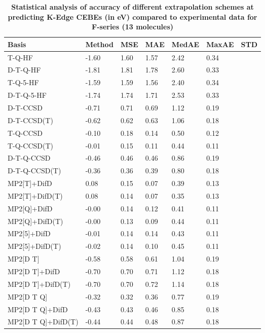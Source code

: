 \begin{table}
  \caption{\textbf{Statistical analysis of accuracy of different extrapolation schemes at predicting K-Edge CEBEs (in eV) compared to experimental data for F-series (13 molecules)}}
  \label{tbl:extrap-scheme-summary-f}
  \begin{tabular}{l l l l l l l }
    \toprule
    \textbf{Basis} & \textbf{Method} & \textbf{MSE} & \textbf{MAE} & \textbf{MedAE} & \textbf{MaxAE} & \textbf{STD} \\ 
    \midrule
    T-Q-HF & -1.60 & 1.60 & 1.57 & 2.42 & 0.34 \\ 
    D-T-Q-HF & -1.81 & 1.81 & 1.78 & 2.60 & 0.33 \\ 
    T-Q-5-HF & -1.59 & 1.59 & 1.56 & 2.40 & 0.34 \\ 
    D-T-Q-5-HF & -1.74 & 1.74 & 1.71 & 2.53 & 0.33 \\ 
    D-T-CCSD & -0.71 & 0.71 & 0.69 & 1.12 & 0.19 \\ 
    D-T-CCSD(T) & -0.62 & 0.62 & 0.63 & 1.06 & 0.18 \\ 
    T-Q-CCSD & -0.10 & 0.18 & 0.14 & 0.50 & 0.12 \\ 
    T-Q-CCSD(T) & -0.01 & 0.15 & 0.11 & 0.44 & 0.11 \\ 
    D-T-Q-CCSD & -0.46 & 0.46 & 0.46 & 0.86 & 0.19 \\ 
    D-T-Q-CCSD(T) & -0.36 & 0.36 & 0.39 & 0.80 & 0.18 \\ 
    MP2[T]+DifD & 0.08 & 0.15 & 0.07 & 0.39 & 0.13 \\ 
    MP2[T]+DifD(T) & 0.08 & 0.14 & 0.07 & 0.35 & 0.13 \\ 
    MP2[Q]+DifD & -0.00 & 0.14 & 0.12 & 0.41 & 0.11 \\ 
    MP2[Q]+DifD(T) & -0.00 & 0.13 & 0.09 & 0.44 & 0.11 \\ 
    MP2[5]+DifD & -0.01 & 0.14 & 0.14 & 0.43 & 0.11 \\ 
    MP2[5]+DifD(T) & -0.02 & 0.14 & 0.10 & 0.45 & 0.11 \\ 
    MP2[D T] & -0.58 & 0.58 & 0.61 & 1.04 & 0.19 \\ 
    MP2[D T]+DifD & -0.70 & 0.70 & 0.71 & 1.12 & 0.18 \\ 
    MP2[D T]+DifD(T) & -0.70 & 0.70 & 0.72 & 1.14 & 0.18 \\ 
    MP2[D T Q] & -0.32 & 0.32 & 0.36 & 0.77 & 0.19 \\ 
    MP2[D T Q]+DifD & -0.43 & 0.43 & 0.46 & 0.85 & 0.18 \\ 
    MP2[D T Q]+DifD(T) & -0.44 & 0.44 & 0.48 & 0.87 & 0.18 \\ 

\end{tabular}
\end{table}
